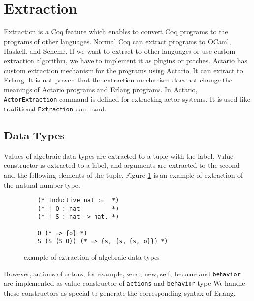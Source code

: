 \section{Extraction}
\label{sec:extraction}

Extraction is a Coq feature which enables to convert Coq programs to the programs of other languages.
Normal Coq can extract programs to OCaml, Haskell, and Scheme.
If we want to extract to other languages or use custom extraction algorithm, we have to implement it as plugins or patches.
Actario has custom extraction mechanism for the programs using Actario.
It can extract to Erlang.
It is not proven that the extraction mechanism does not change the meanings of Actario programs and Erlang programs.
In Actario, \lstinline|ActorExtraction| command is defined for extracting actor systems.
It is used like traditional \lstinline|Extraction| command.

\subsection{Data Types}

Values of algebraic data types are extracted to a tuple with the label.
Value constructor is extracted to a label, and arguments are extracted to the second and the following elements of the tuple.
Figure \ref{coq:adt} is an example of extraction of the natural number type.

\begin{figure}[t]
  \begin{lstlisting}
    (* Inductive nat :=  *)
    (* | O : nat         *)
    (* | S : nat -> nat. *)

    O (* => {o} *)
    S (S (S O)) (* => {s, {s, {s, o}}} *)
  \end{lstlisting}
  \caption{example of extraction of algebraic data types}\label{coq:adt}
\end{figure}

However, actions of actors, for example, \textsf{send}, \textsf{new}, \textsf{self}, \textsf{become} and \texttt{behavior} are implemented as value constructor of \texttt{actions} and \texttt{behavior} type
We handle these constructors as special to generate the corresponding syntax of Erlang.


